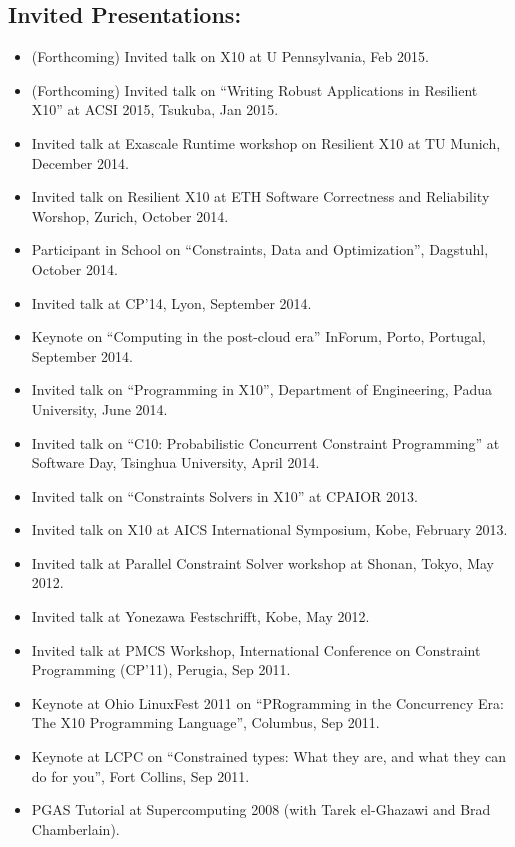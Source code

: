 \documentclass{article}
\begin{document}
\subsection*{Invited Presentations:}
\begin{itemize}

\item (Forthcoming) Invited talk on X10 at U Pennsylvania, Feb 2015.
\item (Forthcoming) Invited talk on ``Writing Robust Applications in
  Resilient X10'' at ACSI 2015, Tsukuba, Jan 2015.
\item Invited talk at Exascale Runtime workshop on Resilient X10 at TU Munich, December 2014.
\item Invited talk on Resilient X10 at ETH Software Correctness and Reliability Worshop, Zurich, October 2014. 
\item Participant in School on ``Constraints, Data and Optimization'', Dagstuhl, October 2014. 
\item Invited talk at CP'14, Lyon, September 2014.
\item Keynote on ``Computing in the post-cloud era'' InForum, Porto, Portugal, September 2014.
\item Invited talk on ``Programming in X10'', Department of Engineering, Padua University, June 2014.
\item Invited talk on ``C10: Probabilistic Concurrent Constraint Programming'' at Software Day, Tsinghua University, April 2014. 
\item Invited talk on ``Constraints Solvers in X10'' at CPAIOR 2013.
\item Invited talk on X10 at AICS International Symposium, Kobe, February 2013.
\item Invited talk at Parallel Constraint Solver workshop at Shonan, Tokyo, May 2012.
\item Invited talk at Yonezawa Festschrifft, Kobe, May 2012.
\item Invited talk at PMCS Workshop, International Conference on
  Constraint Programming (CP'11), Perugia, Sep 2011.
\item Keynote at Ohio LinuxFest 2011 on ``PRogramming in the
  Concurrency Era: The X10 Programming Language'', Columbus, Sep 2011.  
\item Keynote at LCPC on ``Constrained types: What they are, and what
  they can do for you'', Fort Collins, Sep 2011. 
\item PGAS Tutorial at Supercomputing 2008 (with Tarek el-Ghazawi and Brad Chamberlain).

\end{itemize}
\end{document}
